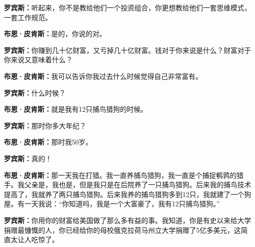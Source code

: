 \begin{BookQuote}
\textbf{罗宾斯：}听起来，你不是教给他们一个投资组合，你更想教给他们一套思维模式，一套工作规范。
\end{BookQuote}

\begin{BookQuote}
\textbf{布恩·皮肯斯：}是的，你说的对。
\end{BookQuote}

\begin{BookQuote}
\textbf{罗宾斯：}你赚到几十亿财富，又亏掉几十亿财富。钱对于你来说是什么？财富对于你来说又意味着什么？
\end{BookQuote}

\begin{BookQuote}
\textbf{布恩·皮肯斯：}我可以告诉你我过去什么时候觉得自己非常富有。
\end{BookQuote}

\begin{BookQuote}
\textbf{罗宾斯：}什么时候？
\end{BookQuote}

\begin{BookQuote}
\textbf{布恩·皮肯斯：}就是我有12只捕鸟猎狗的时候。
\end{BookQuote}

\begin{BookQuote}
\textbf{罗宾斯：}那时你多大年纪？
\end{BookQuote}

\begin{BookQuote}
\textbf{布恩·皮肯斯：}那时我50岁。
\end{BookQuote}

\begin{BookQuote}
\textbf{罗宾斯：}真的！
\end{BookQuote}

\begin{BookQuote}
\textbf{布恩·皮肯斯：}那一天我在打猎。我一直养捕鸟猎狗，我一直是个捕捉鹌鹑的猎手。我父亲是，我也是，但是我只是在后院养了一只捕鸟猎狗。后来我的捕鸟技术提高了，我就养了两只捕鸟猎狗。后来我养的捕鸟猎狗多到12只，我就建了一个狗屋。有一天我说：“你知道吗，我是一个大富豪了，我有12只捕鸟猎狗。”
\end{BookQuote}

\begin{BookQuote}
\textbf{罗宾斯：}你用你的财富给美国做了那么多有益的事。我知道，你是有史以来给大学捐赠最慷慨的人，你已经给你的母校俄克拉荷马州立大学捐赠了5亿多美元，这简直太让人吃惊了。
\end{BookQuote}

